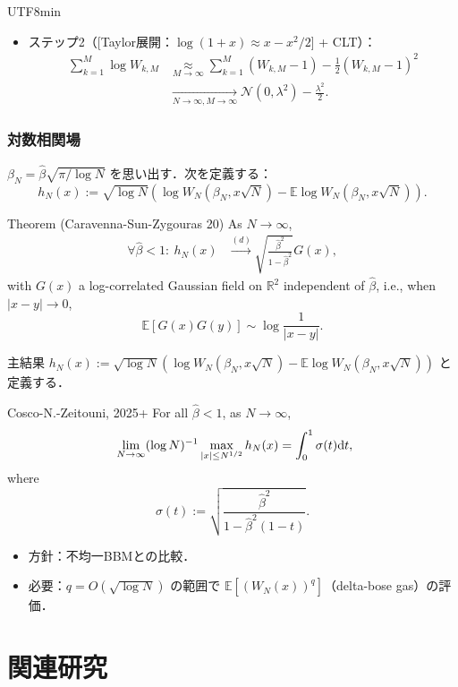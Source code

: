 \documentclass{beamer}
\newcommand{\DE}{{\mathrm E}}
\newcommand{\IE}{\mathbb E}
\renewcommand{\b}{\beta}
\newcommand{\cvlaw}{\stackrel{{ (d)}}{\longrightarrow}}
\begin{document}
\begin{CJK*}{UTF8}{min}
\begin{frame}
\begin{itemize}
  \[W_{k,M} := \DE\left[e^{\sum_{n=N^{k/M}}^{N^{(k+1)/M}} \left(\beta_N \omega(n,S_n) - \Lambda(\beta_N)\right)}\right].\]
  \item ステップ2（[Taylor展開：$\log (1+x)\approx x-x^2/2$] + CLT）：
  \begin{align*}
    \sum_{k=1}^M \log W_{k,M} & \underset{M\to\infty}{\approx} \sum_{k=1}^M (W_{k,M}-1) - \frac{1}{2}(W_{k,M}-1)^2 \\
    &\underset{N\to\infty,M\to\infty}{\longrightarrow} \mathcal N(0,\lambda^2) -\frac{\lambda^2}{2}.
  \end{align*}
\end{itemize}
\end{frame}

\begin{frame}
\frametitle{対数相関場}
$\beta_N = \hat{\beta}\sqrt{\pi/\log N}$ を思い出す．次を定義する：
$$ h_N(x):=\sqrt{\log N} \left(\log W_N(\beta_N,x\sqrt N) - \IE \log W_N(\beta_N,x\sqrt{N})\right).$$
\begin{block}{Theorem (Caravenna-Sun-Zygouras 20)}
  As $N\to\infty$,
\begin{align*} \label{eq:GFFlimit}
\forall \hat{\b}<1: \ h_N(x)& \cvlaw \sqrt{\frac {\hat {\b}^2} {1-{\hat \b}^2}} G(x),
\end{align*}
with $G(x)$ a log-correlated Gaussian field on $\mathbb R^2$ independent of $\hat{\beta}$, i.e., when $|x-y|\to 0$,\ $$\IE[G(x)G(y)]\sim \log \frac{1}{|x-y|}.$$ 
\end{block} 
\end{frame}


\begin{frame}{主結果}
$h_N(x):=\sqrt{\log N} \left(\log W_N(\beta_N,x\sqrt N) - \IE \log W_N(\beta_N,x\sqrt{N})\right)$ と定義する．
\begin{block}{Cosco-N.-Zeitouni, 2025+}
  For all $\hat \beta < 1$, as $N\to\infty$,
\[\ \lim_{N\to\infty}(\log N)^{-1}\max_{|x|\leq N^{1/2}} h_N(x) = \int_{0}^1 \sigma(t) {\rm d}t,
\]
where 
$$\sigma(t) :=  \sqrt{\frac{\hat\beta^2}{1-\hat\beta^2 (1-t)}}.$$
\end{block}
\begin{itemize}
\item<2-> 方針：不均一BBMとの比較．
\item<3-> 必要：$q = O(\sqrt{\log N})$ の範囲で $\IE[(W_N(x))^q]$（delta-bose gas）の評価．
\end{itemize}
\end{frame}


\section{関連研究}


\end{CJK*}
\end{document}
